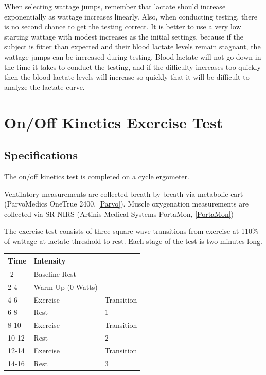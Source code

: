 \documentclass[
]{book}
\begin{document}
When selecting wattage jumps, remember that lactate should increase exponentially as wattage increases linearly. Also, when conducting testing, there is no second chance to get the testing correct. It is better to use a very low starting wattage with modest increases as the initial settings, because if the subject is fitter than expected and their blood lactate levels remain stagnant, the wattage jumps can be increased during testing. Blood lactate will not go down in the time it takes to conduct the testing, and if the difficulty increases too quickly then the blood lactate levels will increase so quickly that it will be difficult to analyze the lactate curve.

\hypertarget{ExerciseTesting-Onoff}{%
\section{On/Off Kinetics Exercise Test}\label{ExerciseTesting-Onoff}}

\hypertarget{ExerciseTesting-Onoff-Specs}{%
\subsection{Specifications}\label{ExerciseTesting-Onoff-Specs}}

The on/off kinetics test is completed on a cycle ergometer.

Ventilatory measurements are collected breath by breath via metabolic cart (ParvoMedics OneTrue 2400, \ref{Parvo}). Muscle oxygenation measurements are collected via SR-NIRS (Artinis Medical Systems PortaMon, \ref{PortaMon})

The exercise test consists of three square-wave transitions from exercise at 110\% of wattage at lactate threshold to rest. Each stage of the test is two minutes long.

\begin{longtable}[]{@{}lll@{}}
\toprule\noalign{}
Time & Intensity & \\
\midrule\noalign{}
\endhead
\bottomrule\noalign{}
\endlastfoot
0-2 & Baseline Rest & \\
2-4 & Warm Up (0 Watts) & \\
4-6 & Exercise & Transition \\
6-8 & Rest & 1 \\
8-10 & Exercise & Transition \\
10-12 & Rest & 2 \\
12-14 & Exercise & Transition \\
14-16 & Rest & 3 \\
\end{longtable}
\end{document}
